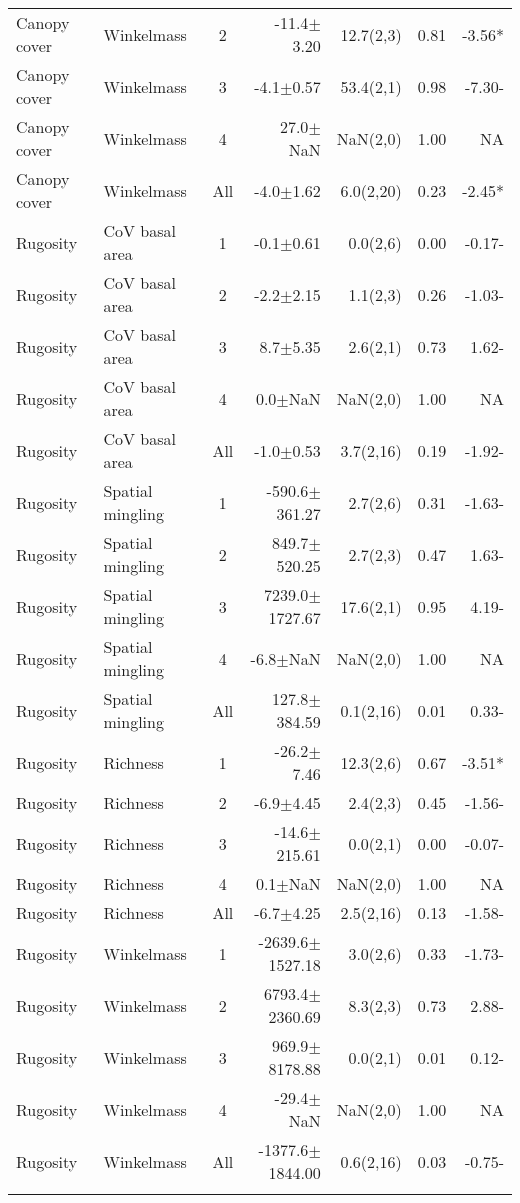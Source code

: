 \begin{longtable}{llcrrS[table-format=1.2]r}
  Canopy cover & Winkelmass & 2 & -11.4$\pm$3.20 & 12.7(2,3) & 0.81 & -3.56* \\ 
  Canopy cover & Winkelmass & 3 & -4.1$\pm$0.57 & 53.4(2,1) & 0.98 & -7.30- \\ 
  Canopy cover & Winkelmass & 4 & 27.0$\pm$NaN & NaN(2,0) & 1.00 & NA \\ 
  Canopy cover & Winkelmass & All & -4.0$\pm$1.62 & 6.0(2,20) & 0.23 & -2.45* \\ 
   \midrule
Rugosity & CoV basal area & 1 & -0.1$\pm$0.61 & 0.0(2,6) & 0.00 & -0.17- \\ 
  Rugosity & CoV basal area & 2 & -2.2$\pm$2.15 & 1.1(2,3) & 0.26 & -1.03- \\ 
  Rugosity & CoV basal area & 3 & 8.7$\pm$5.35 & 2.6(2,1) & 0.73 & 1.62- \\ 
  Rugosity & CoV basal area & 4 & 0.0$\pm$NaN & NaN(2,0) & 1.00 & NA \\ 
  Rugosity & CoV basal area & All & -1.0$\pm$0.53 & 3.7(2,16) & 0.19 & -1.92- \\ 
   \midrule
Rugosity & Spatial mingling & 1 & -590.6$\pm$361.27 & 2.7(2,6) & 0.31 & -1.63- \\ 
  Rugosity & Spatial mingling & 2 & 849.7$\pm$520.25 & 2.7(2,3) & 0.47 & 1.63- \\ 
  Rugosity & Spatial mingling & 3 & 7239.0$\pm$1727.67 & 17.6(2,1) & 0.95 & 4.19- \\ 
  Rugosity & Spatial mingling & 4 & -6.8$\pm$NaN & NaN(2,0) & 1.00 & NA \\ 
  Rugosity & Spatial mingling & All & 127.8$\pm$384.59 & 0.1(2,16) & 0.01 & 0.33- \\ 
   \midrule
Rugosity & Richness & 1 & -26.2$\pm$7.46 & 12.3(2,6) & 0.67 & -3.51* \\ 
  Rugosity & Richness & 2 & -6.9$\pm$4.45 & 2.4(2,3) & 0.45 & -1.56- \\ 
  Rugosity & Richness & 3 & -14.6$\pm$215.61 & 0.0(2,1) & 0.00 & -0.07- \\ 
  Rugosity & Richness & 4 & 0.1$\pm$NaN & NaN(2,0) & 1.00 & NA \\ 
  Rugosity & Richness & All & -6.7$\pm$4.25 & 2.5(2,16) & 0.13 & -1.58- \\ 
   \midrule
Rugosity & Winkelmass & 1 & -2639.6$\pm$1527.18 & 3.0(2,6) & 0.33 & -1.73- \\ 
  Rugosity & Winkelmass & 2 & 6793.4$\pm$2360.69 & 8.3(2,3) & 0.73 & 2.88- \\ 
  Rugosity & Winkelmass & 3 & 969.9$\pm$8178.88 & 0.0(2,1) & 0.01 & 0.12- \\ 
  Rugosity & Winkelmass & 4 & -29.4$\pm$NaN & NaN(2,0) & 1.00 & NA \\ 
  Rugosity & Winkelmass & All & -1377.6$\pm$1844.00 & 0.6(2,16) & 0.03 & -0.75- \\ 
  \label{bivar_lm_summ}
\end{longtable}

